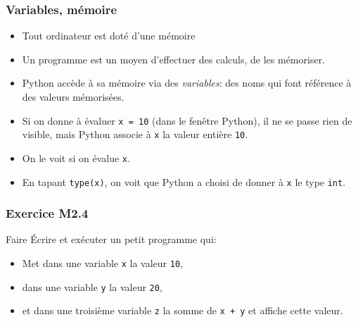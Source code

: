\documentclass{beamer}
\newcommand{\mypause}{\pause}
\newcommand{\pyth}{{\sc Python}}
\newcommand{\prog}[1]{\alert{\texttt{#1}}}
\begin{document}
\frame
{
\frametitle{Variables, mémoire}
\begin{itemize}
\item Tout ordinateur est doté d'une mémoire\mypause{}
\item Un programme est un moyen d'effectuer des calculs, de les mémoriser.\mypause{}
\item \pyth{} accède à sa mémoire via des {\em variables}: des noms qui font référence
à des valeurs mémorisées. \mypause{}
\item Si on donne à évaluer \prog{x = 10} (dans le fenêtre \pyth{}), il ne se passe
rien de visible, mais \pyth{} associe à \prog{x} la valeur entière \prog{10}.\mypause{}
\item On le voit si on évalue \prog{x}.
\item En tapant \prog{type(x)}, on voit que \pyth{} a choisi de donner à \prog{x} le type
\prog{int}.
\end{itemize}
}

\frame
{
\frametitle{Exercice M2.4}
{\footnotesize
\begin{block}{Faire}
\'Ecrire et exécuter un petit programme qui:
\begin{itemize}
\item Met dans une variable \prog{x} la valeur \prog{10},
\item dans une variable \prog{y} la valeur \prog{20},
\item et dans une troisième variable \prog{z} la somme de \prog{x + y} et affiche cette
valeur.
\end{itemize}
\end{block}


}
}
\end{document}
